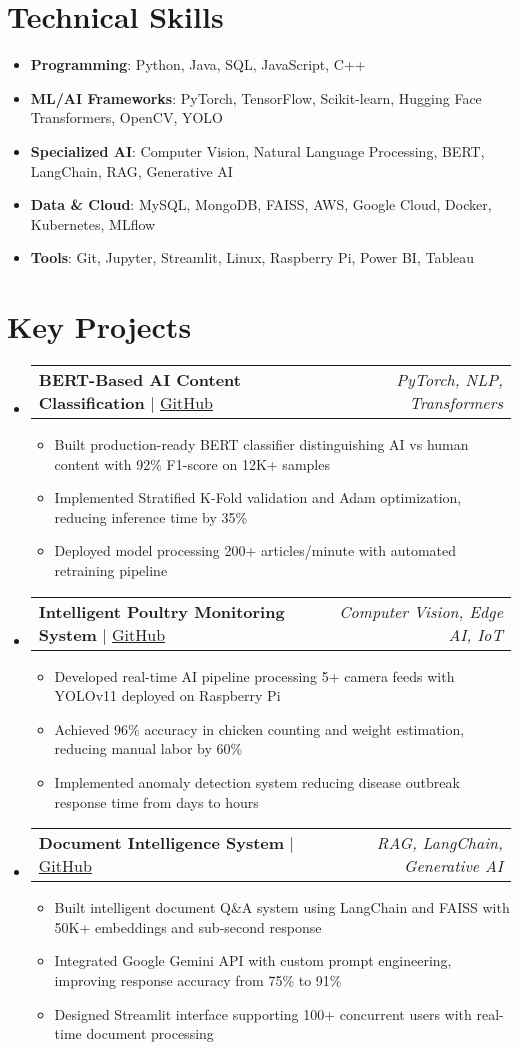 \documentclass[letterpaper,10.8pt]{article}
\makeatletter
\newcommand{\resumeItem}[1]{
  \item\small{#1}
}
\newcommand{\resumeProjectHeading}[2]{
  \item
  \begin{tabular*}{0.97\textwidth}{l@{\extracolsep{\fill}}r}
    \small#1 & #2 \\
  \end{tabular*}\vspace{-3pt}
}
\newcommand{\resumeSubHeadingListStart}{\begin{itemize}[leftmargin=0.15in, label={}, itemsep=2pt]}
\newcommand{\resumeSubHeadingListEnd}{\end{itemize}\vspace{0pt}}
\newcommand{\resumeItemListStart}{\begin{itemize}[leftmargin=*,itemsep=2pt,parsep=0pt,topsep=1pt]}
\newcommand{\resumeItemListEnd}{\end{itemize}\vspace{0pt}}
\makeatother
\begin{document}
\section{Technical Skills}
\resumeItemListStart
    \resumeItem{\textbf{Programming}: Python, Java, SQL, JavaScript, C++}
    \resumeItem{\textbf{ML/AI Frameworks}: PyTorch, TensorFlow, Scikit-learn, Hugging Face Transformers, OpenCV, YOLO}
    \resumeItem{\textbf{Specialized AI}: Computer Vision, Natural Language Processing, BERT, LangChain, RAG, Generative AI}
    \resumeItem{\textbf{Data \& Cloud}: MySQL, MongoDB, FAISS, AWS, Google Cloud, Docker, Kubernetes, MLflow}
    \resumeItem{\textbf{Tools}: Git, Jupyter, Streamlit, Linux, Raspberry Pi, Power BI, Tableau}
\resumeItemListEnd

\section{Key Projects}
\resumeSubHeadingListStart
  \resumeProjectHeading
      {\textbf{BERT-Based AI Content Classification} $|$ \href{https://github.com/hawkh}{GitHub}}{\emph{PyTorch, NLP, Transformers}}
      \resumeItemListStart
        \resumeItem{Built production-ready BERT classifier distinguishing AI vs human content with 92\% F1-score on 12K+ samples}
        \resumeItem{Implemented Stratified K-Fold validation and Adam optimization, reducing inference time by 35\%}
        \resumeItem{Deployed model processing 200+ articles/minute with automated retraining pipeline}
      \resumeItemListEnd
  \resumeProjectHeading
    {\textbf{Intelligent Poultry Monitoring System} $|$ \href{https://github.com/hawkh}{GitHub}}{\emph{Computer Vision, Edge AI, IoT}}
    \resumeItemListStart
        \resumeItem{Developed real-time AI pipeline processing 5+ camera feeds with YOLOv11 deployed on Raspberry Pi}
        \resumeItem{Achieved 96\% accuracy in chicken counting and weight estimation, reducing manual labor by 60\%}
        \resumeItem{Implemented anomaly detection system reducing disease outbreak response time from days to hours}
    \resumeItemListEnd
  \resumeProjectHeading
      {\textbf{Document Intelligence System} $|$ \href{https://github.com/hawkh}{GitHub}}{\emph{RAG, LangChain, Generative AI}}
      \resumeItemListStart
          \resumeItem{Built intelligent document Q\&A system using LangChain and FAISS with 50K+ embeddings and sub-second response}
          \resumeItem{Integrated Google Gemini API with custom prompt engineering, improving response accuracy from 75\% to 91\%}
          \resumeItem{Designed Streamlit interface supporting 100+ concurrent users with real-time document processing}
      \resumeItemListEnd
\resumeSubHeadingListEnd
\end{document}

